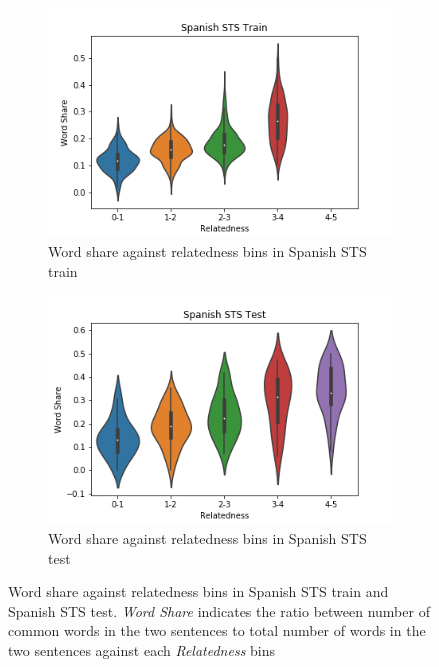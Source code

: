 \begin{enumerate}
\begin{figure}
	\captionsetup[subfigure]{justification=centering}
	\centering
	\begin{subfigure}[b]{.5\textwidth}
		\centering
		\includegraphics[width=\textwidth]{figures/semantic_textual_similarity/introduction/spanish_sts_train_word_share.png}
		\caption{Word share against relatedness bins in Spanish STS train}
		\label{fig:spanish_sts_train_word_share}
	\end{subfigure}%
	\begin{subfigure}[b]{.5\textwidth}
		\centering
		\includegraphics[width=\textwidth]{figures/semantic_textual_similarity/introduction/spanish_sts_test_word_share.png}
		\caption{Word share against relatedness bins in Spanish STS test}
		\label{fig:spanish_sts_test_word_share}
	\end{subfigure}
	\caption[Word share against relatedness bins in Spanish STS train and STS 2017 test.]{Word share against relatedness bins in Spanish STS train and Spanish STS test. \textit{Word Share} indicates the ratio between number of common words in the two sentences to total number of words in the two sentences against each \textit{Relatedness} bins}
	\label{fig:spanish_sts_word_share}
\end{figure}


\end{enumerate}
